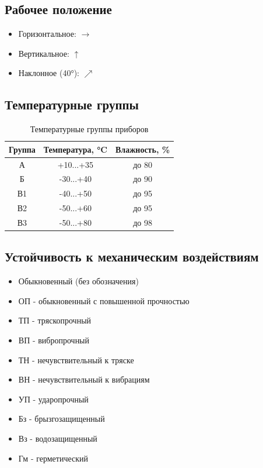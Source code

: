 \documentclass[14pt, a4paper, twoside]{extreport}
\begin{document}
\subsection{Рабочее положение}
\begin{itemize}
  \item Горизонтальное: $\rightarrow$
  \item Вертикальное: $\uparrow$
  \item Наклонное (40°): $\nearrow$
\end{itemize}

\subsection{Температурные группы}
\begin{table}[H]
  \centering
  \begin{tabular}{|c|c|c|}
    \hline
    \textbf{Группа} & \textbf{Температура, °C} & \textbf{Влажность, \%} \\
    \hline
    А & +10...+35 & до 80 \\
    Б & -30...+40 & до 90 \\
    В1 & -40...+50 & до 95 \\
    В2 & -50...+60 & до 95 \\
    В3 & -50...+80 & до 98 \\
    \hline
  \end{tabular}
  \caption{Температурные группы приборов}
\end{table}

\subsection{Устойчивость к механическим воздействиям}
\begin{itemize}
  \item Обыкновенный (без обозначения)
  \item ОП - обыкновенный с повышенной прочностью
  \item ТП - тряскопрочный
  \item ВП - вибропрочный
  \item ТН - нечувствительный к тряске
  \item ВН - нечувствительный к вибрациям
  \item УП - ударопрочный
  \item Бз - брызгозащищенный
  \item Вз - водозащищенный
  \item Гм - герметический
\end{itemize}
\end{document}
